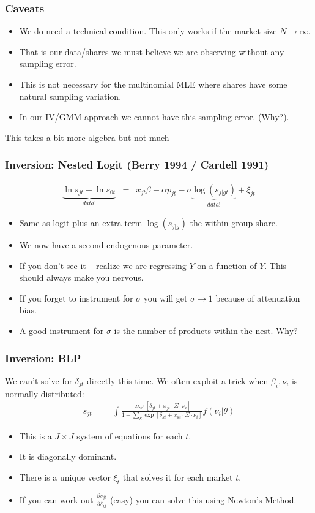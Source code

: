\begin{frame}
\frametitle{Caveats}
\begin{itemize}
\item We do need a technical condition. This only works if the market size $N \rightarrow \infty$.
\item That is our data/shares we must believe we are observing without any sampling error.
\item This is not necessary for the multinomial MLE where shares have some natural sampling variation.
\item In our IV/GMM approach we cannot have this sampling error. (Why?).
 \end{itemize}
\end{frame}


\begin{frame}
This takes a bit more algebra but not much
\frametitle{Inversion: Nested Logit (Berry 1994 / Cardell 1991)}
\begin{eqnarray*}
\underbrace{\ln s_{jt}- \ln s_{0t}}_{data!}&=& x_{jt} \beta -\alpha p_{jt} - \sigma \underbrace{\log(s_{j|gt})}_{data!}+  \xi_{jt}
\end{eqnarray*}
 \begin{itemize}
\item Same as logit plus an extra term $\log(s_{j|g})$ the \alert{within group share}.
\item We now have a second endogenous parameter.
\item If you don't see it -- realize we are regressing $Y$ on a function of $Y$. This should always make you nervous.
\item If you forget to instrument for $\sigma$ you will get $\sigma \rightarrow 1$ because of \alert{attenuation bias}.
\item A good instrument for $\sigma$ is the number of products within the nest. Why?
 \end{itemize}
\end{frame}

\begin{frame}
\frametitle{Inversion: BLP}
We can't solve for $\delta_{jt}$ directly this time. We often exploit a trick when $\beta_i,\nu_i$ is normally distributed:
\begin{eqnarray*}
s_{jt} &=& \int \frac{\exp[\delta_{jt} + x_{jt} \cdot\Sigma \cdot \nu_i ]}{1+\sum_k \exp[\delta_{kt} +  x_{kt} \cdot\Sigma \cdot \nu_i  ]} f(\nu_i | \theta)
\end{eqnarray*}
 \begin{itemize}
 \item This is a $J \times J$ system of equations for each $t$.
 \item It is diagonally dominant.
 \item There is a unique vector $\xi_t$ that solves it for each market $t$.
 \item If you can work out $\frac{\partial s_{jt}}{\partial \delta_{kt}}$ (easy) you can solve this using Newton's Method.
 \end{itemize}
\end{frame}

